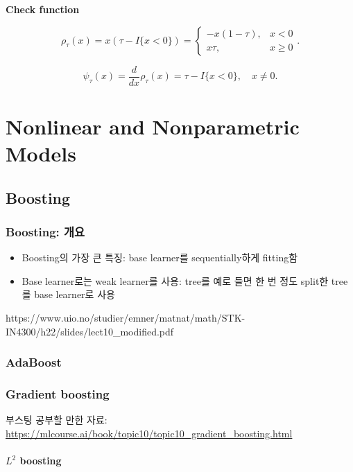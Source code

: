 \documentclass[
  letterpaper,
  DIV=11,
  numbers=noendperiod]{scrreprt}
\theoremstyle{definition}
\theoremstyle{plain}
\theoremstyle{definition}
\theoremstyle{definition}
\theoremstyle{remark}
\begin{document}
\textbf{Check function}

\[
\rho_{\tau} (x)= x(\tau - I\{x<0\})=
\begin{cases}
-x (1-\tau), & x<0\\
x\tau, & x \geq 0
\end{cases}.
\]

\[
\psi_{\tau} (x) = \frac{d}{dx}\rho_{\tau}(x) = \tau - I \{x < 0\}, \quad{} x\neq 0.
\]

\part{Nonlinear and Nonparametric Models}

\chapter{Boosting}\label{boosting}

\section{Boosting: 개요}\label{boosting-uxac1cuxc694}

\begin{itemize}
\item
  Boosting의 가장 큰 특징: base learner를 sequentially하게 fitting함
\item
  Base learner로는 weak learner를 사용: tree를 예로 들면 한 번 정도
  split한 tree를 base learner로 사용
\end{itemize}

https://www.uio.no/studier/emner/matnat/math/STK-IN4300/h22/slides/lect10\_modified.pdf

\section{AdaBoost}\label{adaboost}

\section{Gradient boosting}\label{gradient-boosting}

부스팅 공부할 만한 자료:
\url{https://mlcourse.ai/book/topic10/topic10_gradient_boosting.html}

\subsection{\texorpdfstring{\(L^2\)
boosting}{L\^{}2 boosting}}\label{l2-boosting}
\end{document}
